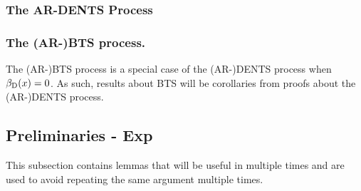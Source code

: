 \subsubsection{The AR-DENTS Process}
        









\subsubsection{The (AR-)BTS process.}

    The (AR-)BTS process is a special case of the (AR-)DENTS process when ${\beta_{{\textnormal{D}}}}(x)=0$. As such, results about BTS will be corollaries from proofs about the (AR-)DENTS process.














\subsection{Preliminaries - Exp}

    






    This subsection contains lemmas that will be useful in multiple times and are used to avoid repeating the same argument multiple times. 

    





